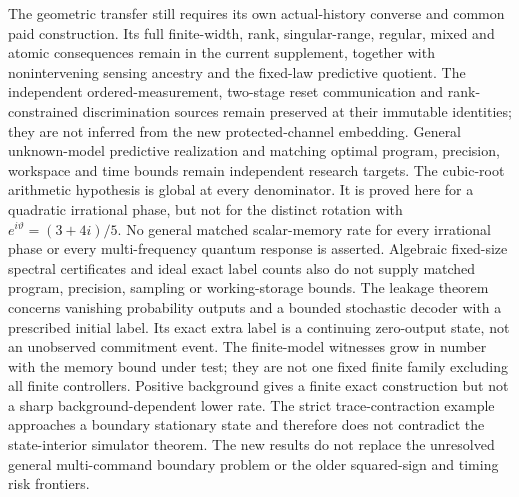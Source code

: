 The geometric transfer still requires its own actual-history converse and common paid construction. Its full finite-width, rank, singular-range, regular, mixed and atomic consequences remain in the current supplement, together with nonintervening sensing ancestry and the fixed-law predictive quotient. The independent ordered-measurement, two-stage reset communication and rank-constrained discrimination sources remain preserved at their immutable identities; they are not inferred from the new protected-channel embedding. General unknown-model predictive realization and matching optimal program, precision, workspace and time bounds remain independent research targets.
The cubic-root arithmetic hypothesis is global at every denominator. It is proved here for a quadratic irrational phase, but not for the distinct rotation with $e^{i\vartheta}=(3+4i)/5$. No general matched scalar-memory rate for every irrational phase or every multi-frequency quantum response is asserted. Algebraic fixed-size spectral certificates and ideal exact label counts also do not supply matched program, precision, sampling or working-storage bounds.
The leakage theorem concerns vanishing probability outputs and a bounded stochastic decoder with a prescribed initial label. Its exact extra label is a continuing zero-output state, not an unobserved commitment event. The finite-model witnesses grow in number with the memory bound under test; they are not one fixed finite family excluding all finite controllers. Positive background gives a finite exact construction but not a sharp background-dependent lower rate. The strict trace-contraction example approaches a boundary stationary state and therefore does not contradict the state-interior simulator theorem. The new results do not replace the unresolved general multi-command boundary problem or the older squared-sign and timing risk frontiers.


